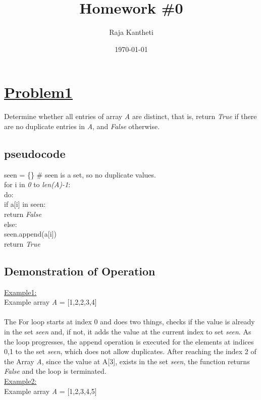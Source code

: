 \documentclass[a4paper,12pt]{article}
\begin{document}
    \title{Homework \#0}
    \author{Raja Kantheti}
    \date{\today}
    \maketitle
    
    
    \section{\underline{\underline{Problem1}}}
    Determine whether all entries of array \emph{A} are distinct, that is, return \emph{True}
     if there are no duplicate entries in \emph{A}, and \emph{False} otherwise.
     \subsection{pseudocode}
     \begin{tabbing}
     seen = \{\} \# seen is a set, so no duplicate values.\\
     for i in \emph{0} to \emph{len(A)-1}:\\
     \hspace{1em}do:\\
     \hspace{2em}if a[i] in seen:\\
     \hspace{3em}return \emph{\textit{False}}\\
     \hspace{2em}else:\\
     \hspace{3em}seen.append(a[i])\\
     return \emph{\textit{True}}
     \end{tabbing}
     
     \subsection{Demonstration of Operation}
     \underline{Example1:}
     \\Example array \emph{A} = [1,2,2,3,4]
     \paragraph{}
     The For loop starts at index 0 and does two things, checks if the value is already in the set \emph{seen} and, if not, it adds the value at the current index to set \emph{seen}.
     As the loop progresses, the append operation is executed for the elements at indices 0,1 to the set \emph{seen}, which does not allow duplicates. 
     After reaching the index 2 of the Array \emph{A}, since the value at A[3], exists in the set
     \emph{seen}, the function returns \emph{False} and the loop is terminated.\\
     \underline{Example2:}\\
     Example array \emph{A} = [1,2,3,4,5]
\end{document}
